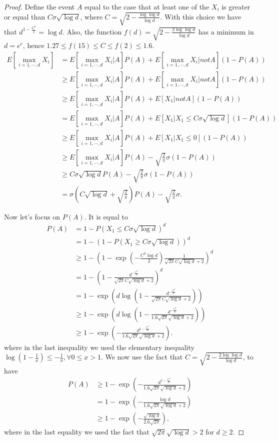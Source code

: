 \documentclass{article}
\begin{document}
\begin{proof}

Define the event $A$ equal to the case that at least one of the $X_i$ is greater or equal than $C \sigma \sqrt{\log d}$, where $C=\sqrt{2-\frac{\log \log d}{\log d}}$. With this choice we have that $d^{1-\frac{C^2}{2}}=\log d$. Also, the function $f(d)=\sqrt{2-\frac{2\log \log d}{\log d}}$ has a minimum in $d=e^e$, hence $1.27 \leq f(15) \leq C\leq f(2)\leq 1.6$.
%
\begin{align*}
E[\max_{i=1,\cdots,d} X_i]
&= E[\max_{i=1,\cdots,d} X_i| A ] P(A) + E[\max_{i=1,\cdots,d} X_i| not A ] (1-P(A)) \\
&\geq E[\max_{i=1,\cdots,d} X_i| A ] P(A) + E[\max_{i=1,\cdots,d} X_i| not A ] (1-P(A))\\
&\geq E[\max_{i=1,\cdots,d} X_i| A ] P(A) + E[X_1| not A ](1-P(A)) \\
&= E[\max_{i=1,\cdots,d} X_i| A ] P(A) + E[X_1| X_1\leq C \sigma \sqrt{\log d}] (1-P(A))\\
&\geq E[\max_{i=1,\cdots,d} X_i| A ] P(A) + E[X_1| X_1\leq 0](1-P(A)) \\
&\geq E[\max_{i=1,\cdots,d} X_i| A ] P(A) - \sqrt{\frac{2}{\pi}} \sigma (1-P(A))\\
&\geq C \sigma \sqrt{\log d} P(A) - \sqrt{\frac{2}{\pi}} \sigma (1-P(A))\\
&= \sigma \left(C\sqrt{\log d} +\sqrt{\frac{2}{\pi}}\right)P(A) -  \sqrt{\frac{2}{\pi}} \sigma.
\end{align*}

Now let's focus on $P(A)$. It is equal to
\begin{align*}
P(A)
&= 1-P(X_1\leq C \sigma \sqrt{\log d})^d \\
&= 1-(1-P(X_1\geq C \sigma \sqrt{\log d}))^d \\
&\geq 1-\left(1-\exp\left(-\frac{C^2 \log d}{2}\right) \frac{1}{\sqrt{2\pi}C \sqrt{\log d}+2}\right)^d \\
&= 1-\left(1-\frac{d^{-\frac{C^2}{2}}}{\sqrt{2\pi}C \sqrt{\log d}+2}\right)^d \\
&= 1- \exp\left(d \log\left(1-\frac{d^{-\frac{C^2}{2}}}{\sqrt{2\pi}C \sqrt{\log d}+2}\right)\right) \\
&\geq 1- \exp\left(d \log\left(1-\frac{d^{-\frac{C^2}{2}}}{1.6 \sqrt{2\pi} \sqrt{\log d}+2}\right)\right) \\
&\geq 1 - \exp\left(-\frac{d^{1-\frac{C^2}{2}}}{1.6 \sqrt{2\pi} \sqrt{\log d}+2}\right).
\end{align*}
where in the last inequality we used the elementary inequality $\log(1-\frac{1}{x}) \leq -\frac{1}{x}, \forall  0\leq x>1$.
We now use the fact that $C=\sqrt{2- \frac{2 \log \log d}{\log d}}$, to have
\begin{align*}
P(A)
& \geq 1 - \exp\left(-\frac{d^{1-\frac{C^2}{2}}}{1.6 \sqrt{2\pi} \sqrt{\log d}+2}\right) \\
& = 1 - \exp\left(-\frac{\log d}{1.6 \sqrt{2\pi} \sqrt{\log d}+2}\right) \\
& \geq 1 - \exp\left(-\frac{\sqrt{\log d}}{2.6 \sqrt{2\pi}}\right),
\end{align*}
where in the last equality we used the fact that $\sqrt{2\pi} \sqrt{\log d} > 2$ for $d\geq 2$.


\end{proof}
\end{document}
